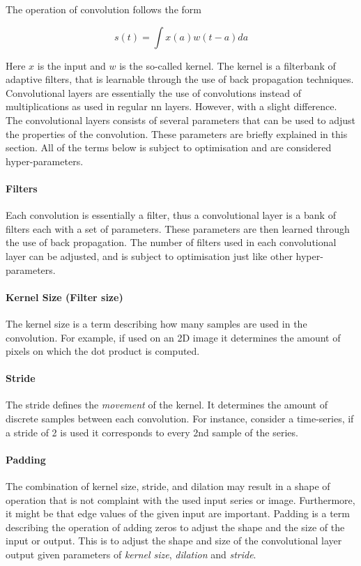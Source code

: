 The operation of convolution follows the form

\begin{equation}\label{eq:convolution}
  s(t) = \int x(a)w(t-a)da
\end{equation}

Here $x$ is the input and $w$ is the so-called kernel. The kernel is a filterbank of adaptive filters, that is learnable through the use of back propagation techniques. Convolutional layers are essentially the use of convolutions instead of multiplications as used in regular \gls{nn} layers. However, with a slight difference. The convolutional layers consists of several parameters that can be used to adjust the properties of the convolution. These parameters are briefly explained in this section. All of the terms below is subject to optimisation and are considered hyper-parameters.

\paragraph{Filters}
Each convolution is essentially a filter, thus a convolutional layer is a bank of filters each with a set of parameters. These parameters are then learned through the use of back propagation. The number of filters used in each convolutional layer can be adjusted, and is subject to optimisation just like other hyper-parameters. 

\paragraph{Kernel Size (Filter size)}
The kernel size is a term describing how many samples are used in the convolution. For example, if used on an 2D image it determines the amount of pixels on which the dot product is computed. 


\paragraph{Stride}
The stride defines the \textit{movement} of the kernel. It determines the amount of discrete samples between each convolution. For instance, consider a time-series, if a stride of 2 is used it corresponds to every 2nd sample of the series. 

\paragraph{Padding}
The combination of kernel size, stride, and dilation may result in a shape of operation that is not complaint with the used input series or image. Furthermore, it might be that edge values of the given input are important. Padding is a term describing the operation of adding zeros to adjust the shape and the size of the input or output. This is to adjust the shape and size of the convolutional layer output given parameters of \emph{kernel size}, \emph{dilation} and \emph{stride}.

